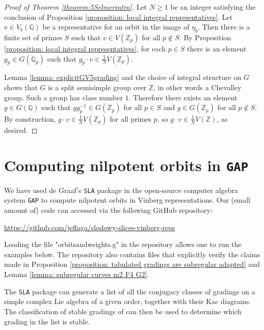 \documentclass{article} %
\numberwithin{equation}{section}
\theoremstyle{definition}
\newcommand{\Q}{\mathbb{Q}}
\newcommand{\Z}{\mathbb{Z}}
\begin{document}
\begin{proof}[Proof of Theorem \ref{theorem:5Selmerintro}]
Let $N\geq 1$ be an integer satisfying the conclusion of Proposition \ref{proposition: local integral representatives}.
Let $v\in V_b(\Q)$ be a representative for an orbit in the image of $\eta_b$.
Then there is a finite set of primes $S$ such that $v\in V(\Z_p)$ for all $p\not\in S$.
By Proposition \ref{proposition: local integral representatives}, for each $p\in S$ there is an element $g_p\in G(\Q_p)$ such that $g_p\cdot v \in \frac{1}{N} V(\Z_p)$. 

Lemma \ref{lemma: explicitGV5grading} and the choice of integral structure on $G$ shows that $G$ is a split semisimple group over $\Z$, in other words a Chevalley group.
Such a group has class number $1$. 
Therefore there exists an element $g\in G(\Q)$ such that $g g_p^{-1} \in G(\Z_p)$ for all $p\in S$ and $g \in G(\Z_p)$ for all $p\not\in S$.
By construction, $g\cdot v\in \frac{1}{N}V(\Z_p)$ for all primes $p$, so $g\cdot v \in \frac{1}{N} V(\Z)$, as desired.
\end{proof}







\appendix

\section{Computing nilpotent orbits in \texttt{GAP}}

We have used de Graaf's \texttt{SLA} package \cite{SLA} in the open-source computer algebra system \texttt{GAP} \cite{GAP4} to compute nilpotent orbits in Vinberg representations.
Our (small amount of) code can accessed via the following GitHub repository:
\begin{center}
    \url{https://github.com/jeflaga/slodowy-slices-vinberg-reps}
\end{center}
Loading the file "orbitsandweights.g" in the repository allows one to run the examples below. 
The repository also contains files that explicitly verify the claims made in Proposition \ref{proposition: tabulated gradings are subregular adapted} and Lemma \ref{lemma: subregular curves m2 F4 G2}.

The \texttt{SLA} package can generate a list of all the conjugacy classes of gradings on a simple complex Lie algebra of a given order, together with their Kac diagrams.
The classification of stable gradings of \cite[Section 7]{GrossLevyReederYu-GradingsPosRank} can then be used to determine which grading in the list is stable.
\end{document}
